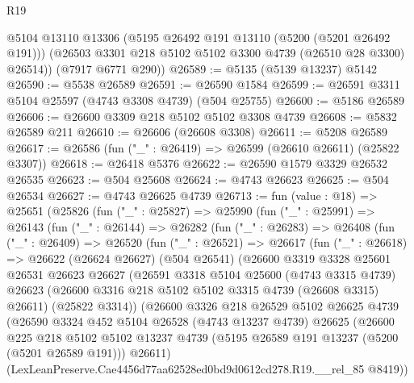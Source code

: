 \begin{lexlean}{R19}
\begin{coremodule}
{{{{{{{{{{{        @5104
        @13110
        @13306
        (@5195 @26492 @191 @13110 (@5200 (@5201 @26492 @191)))
        (@26503 @3301 @218 @5102 @5102 @3300 @4739 (@26510 @28 @3300) @26514))
      (@7917 @6771 @290))
@26589 := @5135 (@5139 @13237) @5142
@26590 := @5538 @26589
@26591 := @26590 @1584
@26599 := @26591 @3311 @5104 @25597 (@4743 @3308 @4739) (@504 @25755)
@26600 := @5186 @26589
@26606 := @26600 @3309 @218 @5102 @5102 @3308 @4739
@26608 := @5832 @26589 @211
@26610 := @26606 (@26608 @3308)
@26611 := @5208 @26589
@26617 := @26586 (fun ("_" : @26419) => @26599 (@26610 @26611) (@25822 @3307))
@26618 := @26418 @5376
@26622 := @26590 @1579 @3329 @26532 @26535
@26623 := @504 @25608
@26624 := @4743 @26623
@26625 := @504 @26534
@26627 := @4743 @26625 @4739
@26713 := fun (value : @18) =>
  @25651
    (@25826
      (fun ("_" : @25827) =>
      @25990
        (fun ("_" : @25991) =>
        @26143
          (fun ("_" : @26144) =>
          @26282
            (fun ("_" : @26283) =>
            @26408
              (fun ("_" : @26409) =>
              @26520
                (fun ("_" : @26521) =>
                @26617
                  (fun ("_" : @26618) =>
                  @26622
                    (@26624 @26627)
                    (@504 @26541)
                    (@26600
                      @3319
                      @3328
                      @25601
                      @26531
                      @26623
                      @26627
                      (@26591
                        @3318
                        @5104
                        @25600
                        (@4743 @3315 @4739)
                        @26623
                        (@26600 @3316 @218 @5102 @5102 @3315 @4739 (@26608 @3315) @26611)
                        (@25822 @3314))
                      (@26600
                        @3326
                        @218
                        @26529
                        @5102
                        @26625
                        @4739
                        (@26590
                          @3324
                          @452
                          @5104
                          @26528
                          (@4743 @13237 @4739)
                          @26625
                          (@26600
                            @225
                            @218
                            @5102
                            @5102
                            @13237
                            @4739
                            (@5195 @26589 @191 @13237 (@5200 (@5201 @26589 @191)))
                            @26611)
                          (LexLeanPreserve.Cae4456d77aa62528ed0bd9d0612cd278.R19.__rel_85 @8419))
}}}}}}}}}}}
\end{coremodule}
\end{lexlean}
